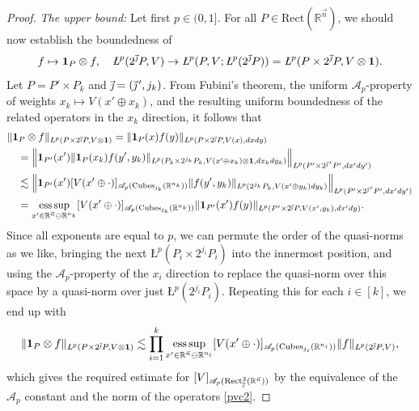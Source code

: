 \documentclass[11pt, reqno]{amsart}
\theoremstyle{definition}
\theoremstyle{remark}
\numberwithin{equation}{section}
\newcommand{\A}{\mathscr A}
\newcommand{\R}{\mathbb R}
\newcommand{\vj}{\vec{\textit{\j}}}
\newcommand{\vjprime}{\vj\,{}'}
\newcommand{\vn}{\vec n}
\newcommand{\esssup}{\operatornamewithlimits{ess\,sup}}
\newcommand{\one}{\mathbf{1}}
\newcommand{\aveL}{\textit{\L}}
\newcommand{\Norm}[2]{\|#1\|_{#2}}
\newcommand{\BNorm}[2]{\Big\|#1\Big\|_{#2}}
\newcommand{\Cubes}{\mathrm{Cubes}}
\newcommand{\Rect}{\mathrm{Rect}}
\begin{document}
\begin{proof}
\textit{The upper bound:}
Let first $p\in(0,1]$. For all $P\in\Rect(\R^{\vn})$, we should now establish the boundedness of
\begin{equation}\label{pvc2}
f\mapsto\one_P\otimes f,\quad\aveL^p(2^{\vj}P,V)\to\aveL^p(P,V;\aveL^p(2^{\vj}P))
=\aveL^p(P\times 2^{\vj}P,V\otimes\one).
\end{equation}
Let $P=P'\times P_k$ and $\vj=(\vjprime,j_k)$. From Fubini's theorem, the uniform $\A_p$-property of weights $x_k\mapsto V(x'\oplus x_k)$, and the resulting uniform boundedness of the related operators in the $x_k$ direction, it follows that
\begin{align*}
&\Norm{\one_P\otimes f}{\aveL^p(P\times 2^{\vj}P,V\otimes\one)}
=\Norm{\one_P(x)f(y)}{\aveL^p(P\times 2^{\vj}P,V(x),dx dy)} \\
&\quad=\BNorm{ \one_{P'}(x') \Norm{\one_P(x_k)f(y',y_k)}{\aveL^p(P_k\times 2^{j_k}P_k,V(x'\oplus x_k)\otimes\one,dx_kdy_k)} }{\aveL^p(P'\times 2^{\vjprime}P',dx'dy')} \\
&\quad\lesssim
\BNorm{ \one_{P'}(x') [V(x'\oplus\cdot)]_{\A_p(\Cubes_{j_k}(\R^{n_k}))}\Norm{f(y',y_k)}{\aveL^p( 2^{j_k}P_k,V(x'\oplus y_k) dy_k)} }{\aveL^p(P'\times 2^{\vjprime}P',dx'dy')} \\
&\quad =\esssup_{x'\in\R^{\vn}\ominus\R^{n_k}}[V(x'\oplus\cdot)]_{\A_p(\Cubes_{j_k}(\R^{n_k}))}
\Norm{ \one_{P'}(x')f(y)}{\aveL^p(P'\times 2^{\vj} P,V(x',y_k),dx' dy)}.
\end{align*}
Since all exponents are equal to $p$, we can permute the order of the quasi-norms as we like, bringing the next $\aveL^p(P_i\times 2^{j_i}P_i)$ into the innermost position,
and using the $\A_p$-property of the $x_i$ direction to replace the quasi-norm over this space by a quasi-norm over just $\aveL^p(2^{j_i}P_i)$. Repeating this for each $i\in[k]$, we end up with
\begin{equation*}
\Norm{\one_P\otimes f}{\aveL^p(P\times 2^{\vj}P,V\otimes\one)}
\lesssim \prod_{i=1}^k \esssup_{x'\in\R^{\vn}\ominus\R^{n_i}}[V(x'\oplus\cdot)]_{\A_p(\Cubes_{j_i}(\R^{n_i}))}
\Norm{f}{\aveL^p(2^{\vj} P,V)},
\end{equation*}
which gives the required estimate for $[V]_{\A_p(\Rect_{\vj}^2(\R^{\vn}))}$ by the equivalence of the $\A_p$ constant and the norm of the operators \eqref{pvc2}.


\end{proof}
\end{document}
